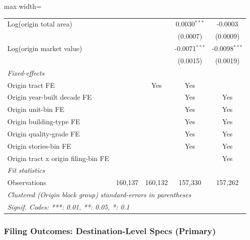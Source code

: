 \documentclass[
  11pt,
]{article}
\begin{document}
\begin{adjustbox}{max width=\textwidth}
\begin{tabular}{lcccc}
   Log(origin total area)                         &                &               & 0.0030$^{***}$  & -0.0003\\   
                                                  &                &               & (0.0007)        & (0.0009)\\   
   Log(origin market value)                       &                &               & -0.0071$^{***}$ & -0.0098$^{***}$\\   
                                                  &                &               & (0.0015)        & (0.0019)\\   
   \midrule
   \emph{Fixed-effects}\\
   Origin tract FE                                &                & Yes           & Yes             & \\  
   Origin year-built decade FE                    &                &               & Yes             & Yes\\  
   Origin unit-bin FE                             &                &               & Yes             & Yes\\  
   Origin building-type FE                        &                &               & Yes             & Yes\\  
   Origin quality-grade FE                        &                &               & Yes             & Yes\\  
   Origin stories-bin FE                          &                &               & Yes             & Yes\\  
   Origin tract x origin filing-bin FE            &                &               &                 & Yes\\  
   \midrule
   \emph{Fit statistics}\\
   Observations                                   & 160,137        & 160,132       & 157,330         & 157,262\\  
   \midrule \midrule
   \multicolumn{5}{l}{\emph{Clustered (Origin block group) standard-errors in parentheses}}\\
   \multicolumn{5}{l}{\emph{Signif. Codes: ***: 0.01, **: 0.05, *: 0.1}}\\
\end{tabular}
\par\endgroup

\end{adjustbox}

\subsubsection{Filing Outcomes: Destination-Level Specs
(Primary)}\label{filing-outcomes-destination-level-specs-primary}
\end{document}
